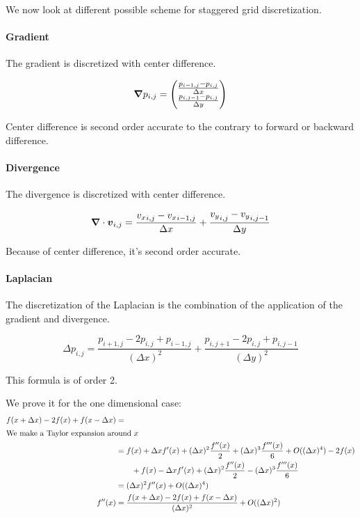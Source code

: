 We now look at different possible scheme for staggered grid discretization.

\paragraph{Gradient}
\label{fixed:gradient}
The gradient is discretized with center difference.

\begin{equation}
  {\boldsymbol {\nabla}}p_{i,j}=\begin{pmatrix}
                       	\frac{p_{i-1,j}-p_{i,j}}{\Delta x}\\
                       	\frac{p_{i,j-1}-p_{i,j}}{\Delta y}\\
                       \end{pmatrix}
\end{equation}

Center difference is second order accurate to the contrary to forward or backward difference.

\paragraph{Divergence}
\label{fixed:divergence}
The divergence is discretized with center difference.

\begin{equation}
	{\boldsymbol {\nabla}}\cdot {\boldsymbol {v}}_{i,j}=\frac{{v_{x}}_{i,j}-{v_{x}}_{i-1,j}}{\Delta x}+\frac{{v_{y}}_{i,j}-{v_{y}}_{i,j-1}}{\Delta y}
\end{equation}

Because of center difference, it's second order accurate.

\paragraph{Laplacian}
\label{fixed:Laplacian}
The discretization of the Laplacian is the combination of the application of the gradient and divergence.

\begin{equation}
  \Delta p_{i,j}=\frac{p_{i+1,j}-2p_{i,j}+p_{i-1,j}}{(\Delta x)^2}+\frac{p_{i,j+1}-2p_{i,j}+p_{i,j-1}}{(\Delta y)^2}
\end{equation}

This formula is of order 2.

We prove it for the one dimensional case:
\begin{align*}
  f(x+\Delta x)-2f(x)+f(x-\Delta x)&=\\
  \intertext{We make a Taylor expansion around $x$}
  &=f(x)+\Delta x f'(x) +(\Delta x)^2 \frac{f''(x)}{2}+(\Delta x)^3 \frac{f'''(x)}{6}+O((\Delta x)^4)-2f(x)\\
  &\qquad+f(x)-\Delta x f'(x) +(\Delta x)^2 \frac{f''(x)}{2}-(\Delta x)^3 \frac{f'''(x)}{6}\\
  &=(\Delta x)^2f''(x) +O((\Delta x)^4)\\
  f''(x)&=\frac{f(x+\Delta x)-2f(x)+f(x-\Delta x)}{(\Delta x)^2}+O((\Delta x)^2)
\end{align*}


